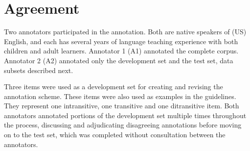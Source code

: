 \section{Agreement}
\label{sec:agreement}
Two annotators participated in the annotation. Both are native speakers of (US) English, and each has several years of language teaching experience with both children and adult learners. Annotator 1 (A1) annotated the complete corpus. Annotator 2 (A2) annotated only the development set and the test set, data subsets described next.

Three items were used as a development set for creating and revising the annotation scheme. These items were also used as examples in the guidelines. They represent one intransitive, one transitive and one ditransitive item. Both annotators annotated portions of the development set multiple times throughout the process, discussing and adjudicating disagreeing annotations before moving on to the test set, which was completed without consultation between the annotators.

